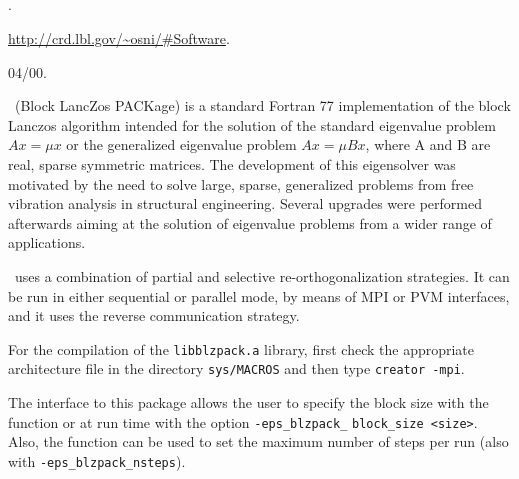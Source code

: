 \subsection*{\underline{\blzpack}}
	\begin{description}
	\setlength{\itemsep}{0pt}
	\item[References.]\citep{Marques:1995:BDU}.
	\item[Website.] \url{http://crd.lbl.gov/\~osni/\#Software}.
	\item[Version.] 04/00.
	\item[Summary.] \blzpack\ (Block LancZos PACKage) is a standard Fortran 77 implementation of the block Lanczos algorithm intended for the solution of the standard eigenvalue problem $Ax=\mu x$ or the generalized eigenvalue problem $Ax=\mu Bx$, where A and B are real, sparse symmetric matrices. The development of this eigensolver was motivated by the need to solve large, sparse, generalized problems from free vibration analysis in structural engineering. Several upgrades were performed afterwards aiming at the solution of eigenvalue problems from a wider range of applications.

	\blzpack\ uses a combination of partial and selective re-orthogonalization strategies. It can be run in either sequential or parallel mode, by means of MPI or PVM interfaces, and it uses the reverse communication strategy.
	\item[Installation.] For the compilation of the \texttt{libblzpack.a} library, first check the appropriate architecture file in the directory \texttt{sys/MACROS} and then type \texttt{creator -mpi}.
	\item[Specific options.] The \slepc interface to this package allows the user to specify the block size with the function  or at run time with the option \Verb!-eps_blzpack_! \Verb!block_size <size>!. Also, the function  can be used to set the maximum number of steps per run (also with \Verb!-eps_blzpack_nsteps!).
	\end{description}


